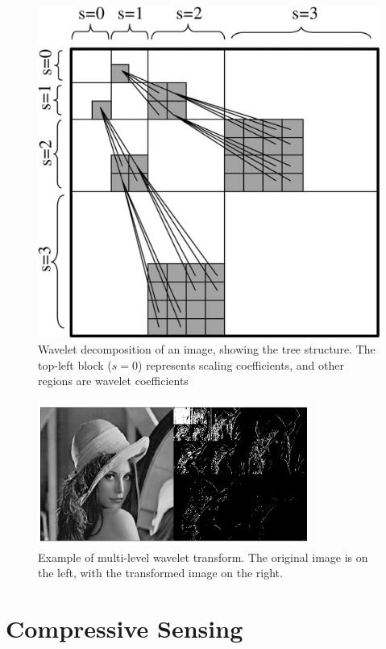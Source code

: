 \documentclass{IEEEtran}
\begin{document}
\begin{figure}
  \centering
  \includegraphics{wavelet_tree}
  \caption{Wavelet decomposition of an image, showing the tree structure. The top-left block
($s = 0$) represents scaling coefficients, and other regions are wavelet coefficients}
\label{fig:tree}
\end{figure}

\begin{figure}[ht]
  \centering
  \includegraphics[width=0.8\textwidth]{lenna_wavelet}
  \caption{Example of multi-level wavelet transform. The original image is on the left, with the transformed image on the right.}
  \label{fig:lenna}
\end{figure}

\section{Compressive Sensing}
\end{document}
